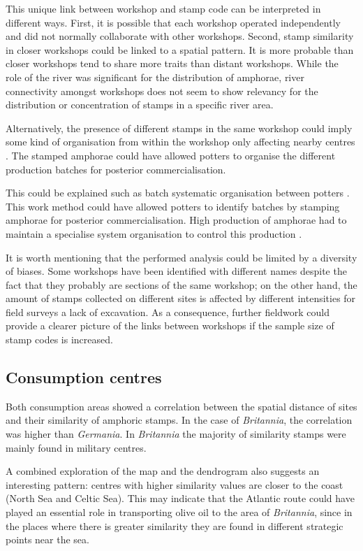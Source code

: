 This unique link between workshop and stamp code can be interpreted in different ways. First, it is possible that each workshop operated independently and did not normally collaborate with other workshops.  Second, stamp similarity in closer workshops could be linked to a spatial pattern. It is more probable than closer workshops tend to share more traits than distant workshops. While the role of the river was significant for the distribution of amphorae, river connectivity amongst workshops does not seem to show relevancy for the distribution or concentration of stamps in a specific river area.

Alternatively, the presence of different stamps in the same workshop could imply some kind of organisation from within the workshop only affecting nearby centres \citep{juanmorostesis}. The stamped amphorae could have allowed potters to organise the different production batches for posterior commercialisation.

This could be explained such as batch systematic organisation between potters \citep{juanmorostesis}. This work method could have allowed potters to identify batches by stamping amphorae for posterior commercialisation. High production of amphorae had to maintain a specialise system organisation to control this production \citep[104]{juanmorostesis}.


It is worth mentioning that the performed analysis could be limited by a diversity of biases. Some workshops have been identified with different names despite the fact that they probably are sections of the same workshop; on the other hand, the amount of stamps collected on different sites is affected by different intensities for field surveys a lack of excavation. As a consequence, further fieldwork could provide a clearer picture of the links between workshops if the sample size of stamp codes is increased.

\subsection{Consumption centres}
\label{sec:7}

Both consumption areas showed a correlation between the spatial distance of sites and their similarity of amphoric stamps. In the case of  \textit{Britannia}, the correlation was higher than \textit{Germania}. In \textit{Britannia} the majority of similarity stamps were mainly found in military centres.  

A combined exploration of the map and the dendrogram also suggests an interesting pattern: centres with higher similarity values are closer to the coast (North Sea and Celtic Sea). This may indicate that the Atlantic route could have played an essential role in transporting olive oil to the area of \textit{Britannia}, since in the places where there is greater similarity they are found in different strategic points near the sea.

